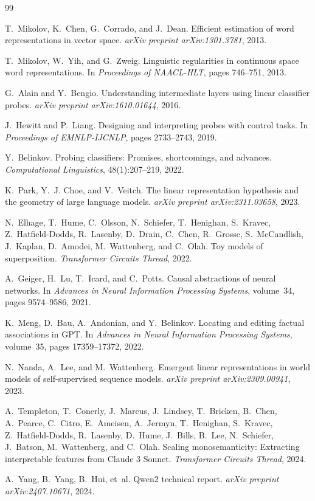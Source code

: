 \documentclass[11pt]{article}
\begin{document}
\begin{thebibliography}{99}

T.~Mikolov, K.~Chen, G.~Corrado, and J.~Dean.
\newblock Efficient estimation of word representations in vector space.
\newblock \emph{arXiv preprint arXiv:1301.3781}, 2013.

T.~Mikolov, W.~Yih, and G.~Zweig.
\newblock Linguistic regularities in continuous space word representations.
\newblock In \emph{Proceedings of NAACL-HLT}, pages 746--751, 2013.

G.~Alain and Y.~Bengio.
\newblock Understanding intermediate layers using linear classifier probes.
\newblock \emph{arXiv preprint arXiv:1610.01644}, 2016.

J.~Hewitt and P.~Liang.
\newblock Designing and interpreting probes with control tasks.
\newblock In \emph{Proceedings of EMNLP-IJCNLP}, pages 2733--2743, 2019.

Y.~Belinkov.
\newblock Probing classifiers: Promises, shortcomings, and advances.
\newblock \emph{Computational Linguistics}, 48(1):207--219, 2022.

K.~Park, Y.~J. Choe, and V.~Veitch.
\newblock The linear representation hypothesis and the geometry of large language models.
\newblock \emph{arXiv preprint arXiv:2311.03658}, 2023.

N.~Elhage, T.~Hume, C.~Olsson, N.~Schiefer, T.~Henighan, S.~Kravec,
  Z.~Hatfield-Dodds, R.~Lasenby, D.~Drain, C.~Chen, R.~Grosse, S.~McCandlish,
  J.~Kaplan, D.~Amodei, M.~Wattenberg, and C.~Olah.
\newblock Toy models of superposition.
\newblock \emph{Transformer Circuits Thread}, 2022.

A.~Geiger, H.~Lu, T.~Icard, and C.~Potts.
\newblock Causal abstractions of neural networks.
\newblock In \emph{Advances in Neural Information Processing Systems}, volume~34, pages 9574--9586, 2021.

K.~Meng, D.~Bau, A.~Andonian, and Y.~Belinkov.
\newblock Locating and editing factual associations in GPT.
\newblock In \emph{Advances in Neural Information Processing Systems}, volume~35, pages 17359--17372, 2022.

N.~Nanda, A.~Lee, and M.~Wattenberg.
\newblock Emergent linear representations in world models of self-supervised sequence models.
\newblock \emph{arXiv preprint arXiv:2309.00941}, 2023.

A.~Templeton, T.~Conerly, J.~Marcus, J.~Lindsey, T.~Bricken, B.~Chen,
  A.~Pearce, C.~Citro, E.~Ameisen, A.~Jermyn, T.~Henighan, S.~Kravec,
  Z.~Hatfield-Dodds, R.~Lasenby, D.~Hume, J.~Bills, B.~Lee, N.~Schiefer,
  J.~Batson, M.~Wattenberg, and C.~Olah.
\newblock Scaling monosemanticity: Extracting interpretable features from
  Claude 3 Sonnet.
\newblock \emph{Transformer Circuits Thread}, 2024.

A.~Yang, B.~Yang, B.~Hui, et~al.
\newblock Qwen2 technical report.
\newblock \emph{arXiv preprint arXiv:2407.10671}, 2024.

\end{thebibliography}
\end{document}
